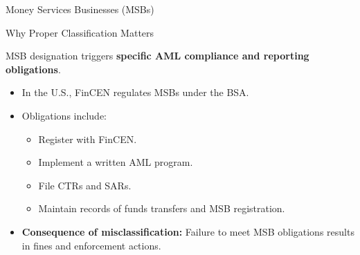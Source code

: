 \documentclass{beamer}
\begin{document}
	\begin{frame}{Money Services Businesses (MSBs)}
		\begin{block}{Why Proper Classification Matters}
			\begin{center}
				MSB designation triggers \textbf{specific AML compliance and reporting obligations}.
			\end{center}
		\end{block}
		\begin{itemize}
			\item In the U.S., FinCEN regulates MSBs under the BSA.
			\item Obligations include:
			\begin{itemize}
				\item Register with FinCEN.
				\item Implement a written AML program.
				\item File CTRs and SARs.
				\item Maintain records of funds transfers and MSB registration.
			\end{itemize}
			\item \textbf{Consequence of misclassification:} Failure to meet MSB obligations results in fines and enforcement actions.
		\end{itemize}
	\end{frame}
	
\end{document}
